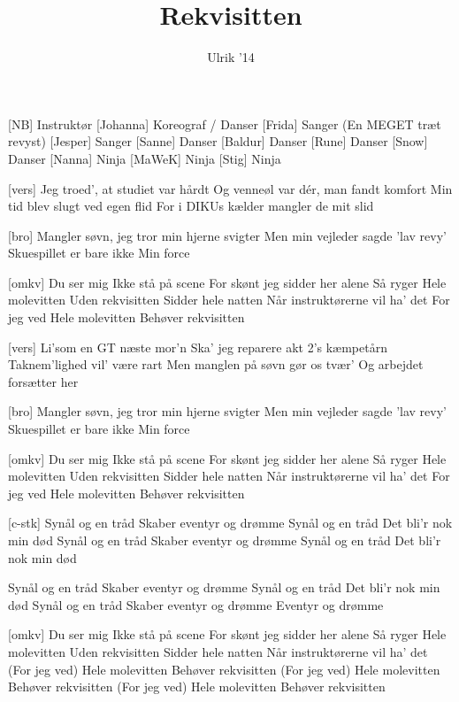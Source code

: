 \documentclass[a4paper,11pt]{article}
\title{Rekvisitten}
\author{Ulrik '14}
\begin{document}
\maketitle

\begin{roles}
[NB] Instruktør
[Johanna] Koreograf / Danser
[Frida] Sanger (En MEGET træt revyst)
[Jesper] Sanger
[Sanne] Danser
[Baldur] Danser
[Rune] Danser
[Snow] Danser
[Nanna] Ninja
[MaWeK] Ninja
[Stig] Ninja
\end{roles}

\begin{song}
[vers]%
Jeg troed', at studiet var hårdt
Og venneøl var dér, man fandt komfort
Min tid blev slugt ved egen flid
For i DIKUs kælder mangler de mit slid

[bro]%
Mangler søvn, jeg tror min hjerne svigter
Men min vejleder sagde 'lav revy'
Skuespillet er bare ikke
Min force

[omkv]%
Du ser mig
Ikke stå på scene
For skønt jeg sidder her alene
Så ryger
Hele molevitten
Uden rekvisitten 
Sidder hele natten
Når instruktørerne vil ha' det
For jeg ved
Hele molevitten
Behøver rekvisitten


[vers]%
Li'som en GT næste mor'n
Ska' jeg reparere akt 2's kæmpetårn
Taknem’lighed vil' være rart
Men manglen på søvn gør os tvær'
Og arbejdet forsætter her

[bro]%
Mangler søvn, jeg tror min hjerne svigter
Men min vejleder sagde 'lav revy' 
Skuespillet er bare ikke
Min force

[omkv]%
Du ser mig
Ikke stå på scene
For skønt jeg sidder her alene
Så ryger
Hele molevitten
Uden rekvisitten
Sidder hele natten
Når instruktørerne vil ha' det
For jeg ved
Hele molevitten
Behøver rekvisitten

[c-stk]%
Synål og en tråd
Skaber eventyr og drømme 
Synål og en tråd
Det bli'r nok min død
Synål og en tråd
Skaber eventyr og drømme 
Synål og en tråd
Det bli'r nok min død

Synål og en tråd
Skaber eventyr og drømme 
Synål og en tråd
Det bli'r nok min død
Synål og en tråd
Skaber eventyr og drømme
Eventyr og drømme

[omkv]%
Du ser mig
Ikke stå på scene
For skønt jeg sidder her alene
Så ryger
Hele molevitten
Uden rekvisitten
Sidder hele natten
Når instruktørerne vil ha' det
(For jeg ved)
Hele molevitten
Behøver rekvisitten
 (For jeg ved)
Hele molevitten
Behøver rekvisitten
(For jeg ved)
Hele molevitten
Behøver rekvisitten
\end{song}
\end{document}
